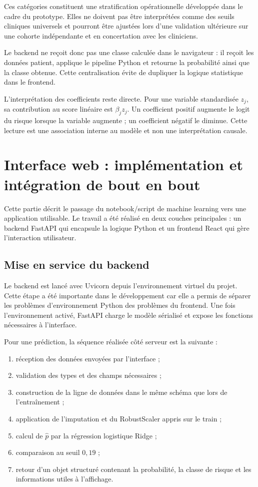 \documentclass[12pt,a4paper]{report}
\begin{document}
Ces catégories constituent une stratification opérationnelle développée
dans le cadre du prototype. Elles ne doivent pas être interprétées comme
des seuils cliniques universels et pourront être ajustées lors d'une
validation ultérieure sur une cohorte indépendante et en concertation avec
les cliniciens.

Le backend ne reçoit donc pas une classe calculée dans le navigateur : il reçoit les
données patient, applique le pipeline Python et retourne la probabilité ainsi que la classe
obtenue. Cette centralisation évite de dupliquer la logique statistique dans le frontend.

L'interprétation des coefficients reste directe. Pour une variable standardisée $z_j$, sa
contribution au score linéaire est $\beta_jz_j$. Un coefficient positif augmente le logit
du risque lorsque la variable augmente ; un coefficient négatif le diminue. Cette lecture
est une association interne au modèle et non une interprétation causale.

\section{Interface web : implémentation et intégration de bout en bout}

Cette partie décrit le passage du notebook/script de machine learning vers une application
utilisable. Le travail a été réalisé en deux couches principales : un backend FastAPI qui
encapsule la logique Python et un frontend React qui gère l'interaction utilisateur.

\subsection{Mise en service du backend}

Le backend est lancé avec Uvicorn depuis l'environnement virtuel du projet. Cette étape a
été importante dans le développement car elle a permis de séparer les problèmes
d'environnement Python des problèmes du frontend. Une fois l'environnement activé,
FastAPI charge le modèle sérialisé et expose les fonctions nécessaires à l'interface.

Pour une prédiction, la séquence réalisée côté serveur est la suivante :
\begin{enumerate}[leftmargin=1.5em]
 \item réception des données envoyées par l'interface ;
 \item validation des types et des champs nécessaires ;
 \item construction de la ligne de données dans le même schéma que lors de l'entraînement ;
 \item application de l'imputation et du RobustScaler appris sur le train ;
 \item calcul de $\hat p$ par la régression logistique Ridge ;
 \item comparaison au seuil $0{,}19$ ;
 \item retour d'un objet structuré contenant la probabilité, la classe de risque et les
 informations utiles à l'affichage.
\end{enumerate}
\end{document}
